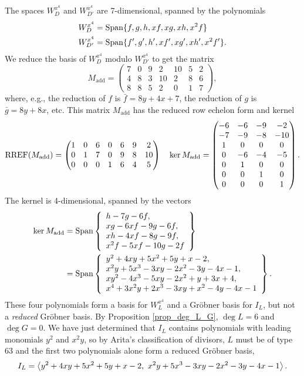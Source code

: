 The spaces $W_D^{x^4}$ and $W_{D'}^{x^4}$ are 7-dimensional, spanned by the polynomials
\begin{align*}
  W_D^{x^4} &= \operatorname{Span}\{ f, g, h, xf, xg, xh, x^2f \} \\
  W_{D'}^{x^4} &= \operatorname{Span}\{ f', g', h', xf', xg', xh', x^2f' \}.
\end{align*}
We reduce the basis of $W_D^{x^4}$ modulo $W_{D'}^{x^4}$ to get the matrix
\[ M_{\text{add}} = \begin{pmatrix}
  7 & 0 & 9 & 2 & 10 & 5 & 2 \\
  4 & 8 & 3 & 10 & 2 & 8 & 6 \\
  8 & 8 & 5 & 2 & 0 & 1 & 7
\end{pmatrix}, \]
where, e.g., the reduction of $f$ is $\bar f = 8y + 4x + 7$,
the reduction of $g$ is $\bar g = 8y + 8x$, etc.
This matrix $M_{\text{add}}$ has the reduced row echelon form
and kernel
\[ \operatorname{RREF}(M_{\text{add}}) = \begin{pmatrix}
  1 & 0 & 6 & 0 & 6 & 9 & 2 \\
  0 & 1 & 7 & 0 & 9 & 8 & 10 \\
  0 & 0 & 0 & 1 & 6 & 4 & 5
\end{pmatrix} ~~~ \ker M_{\text{add}} =
\begin{pmatrix}
  -6 & -6 & -9 & -2 \\
  -7 & -9 & -8 & -10 \\
   1 &  0 &  0 &  0 \\
   0 & -6 & -4 & -5 \\
   0 &  1 &  0 &  0 \\
   0 &  0 &  1 &  0 \\
   0 &  0 &  0 &  1
\end{pmatrix}. \]
The kernel is 4-dimensional, spanned by the vectors
\begin{align*}
  \ker M_{\text{add}}
    &= \operatorname{Span} \left\{ \begin{array}{l}
               h -  7g - 6f, \\
        xg - 6xf -  9g - 6f, \\
        xh - 4xf -  8g - 9f, \\
      x^2f - 5xf - 10g - 2f \end{array} \right\} \\
    &= \operatorname{Span} \left\{ \begin{array}{l}
      y^2 + 4xy + 5x^2 + 5y + x - 2, \\
      x^2y + 5x^3 - 3xy - 2x^2 - 3y - 4x - 1, \\
      xy^2 - 4x^3 - 5xy - 2x^2 + y + 3x + 4, \\
      x^4 + 3x^2y + 2x^3 - 3xy + x^2 - 4y - 4x - 1
    \end{array} \right\}.
\end{align*}
These four polynomials form a basis for $W_L^{x^4}$ and a Gr\"obner basis for $I_L$,
but not a \emph{reduced} Gr\"obner basis.
By Proposition \ref{prop_deg_L_G}, $\deg L = 6$ and $\deg G = 0$.
We have just determined that $I_L$ contains polynomials with leading monomials $y^2$ and $x^2y$,
so by Arita's classification of divisors, $L$ must be of type 63 and the first two polynomials
alone form a reduced Gr\"obner basis,
  \[ I_L = \left\langle  y^2 + 4xy + 5x^2 + 5y + x - 2, ~x^2y + 5x^3 - 3xy - 2x^2 - 3y - 4x - 1 \right\rangle.\]

